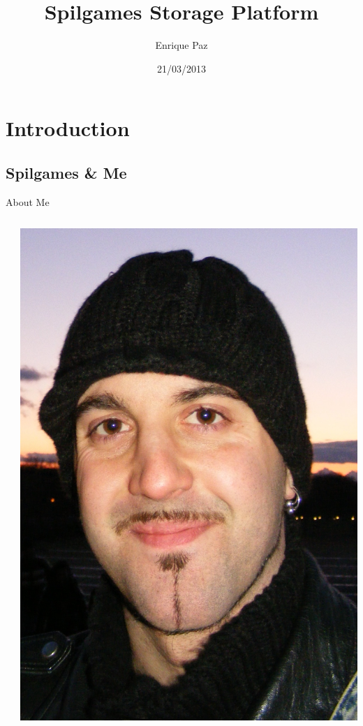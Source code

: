 \documentclass[aspectratio=169]{beamer}
\title[]{\alert{Spilgames Storage Platform}}
\author[]{Enrique Paz}
\institute[] %
{Senior Backend Developer}
\date[]{21/03/2013}
\begin{document}
\begin{frame}
    \titlepage
\end{frame}

\section{Introduction}
\subsection{Spilgames \& Me}

\begin{frame}{About Me}
    \begin{columns}
        \begin{column}[c]{0.05\textwidth}
        \end{column}
        \begin{column}[c]{0.2\textwidth}
            \includegraphics[width=\textwidth]{images/me.png}

\end{column}
\end{columns}
\end{frame}
\end{document}
